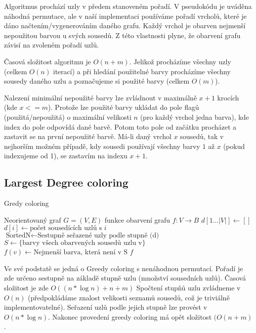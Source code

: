 \documentclass[12pt, a4paper]{article}
\begin{document}
Algoritmus prochází uzly v předem stanoveném pořadí.
V pseudokódu je uváděna náhodná permutace, ale v naší implementaci používáme pořadí vrcholů, které je dáno načtením/vygenerováním daného grafu.
Každý vrchol je obarven nejmenší nepoužitou barvou u svých sousedů.
Z této vlastnosti plyne, že obarvení grafu závisí na zvoleném pořadí uzlů.

Časová složitost algoritmu je $O(n+m)$.
Jelikož procházíme všechny uzly (celkem $O(n)$ iterací)
a při hledání použitelné barvy procházíme všechny sousedy daného uzlu a poznačujeme si použité barvy (celkem $O(m)$).

Nalezení minimální nepoužité barvy lze zvládnout v maximálně $x+1$ krocích (kde $x <= m$).
Protože lze použité barvy ukládat do pole flagů (použitá/nepoužitá) o maximální velikosti $n$ (pro každý vrchol jedna barva),
kde index do pole odpovídá dané barvě.
Potom toto pole od začátku procházet a zastavit se na první nepoužité barvě.
Má-li daný vrchol $x$ sousedů, tak v nejhorším možném případě, kdy sousedi používají všechny barvy $1$ až $x$ (pokud indexujeme od 1),
se zastavím na indexu $x+1$.

\subsection{Largest Degree coloring}
\begin{algorithm}
\caption{Gredy coloring} %
\label{Greedy coloring}
\begin{algorithmic}
\Input Neorientovaný graf $G = (V, E)$
\Output funkce obarvení grafu $f: 	V \rightarrow B$
\State $d[1 \dots |V|] \leftarrow []$
	\State $d[i] \leftarrow \text{počet sousedících uzlů s }i$
\EndFor
\State $\text{SortedN} \leftarrow \text{Sestupně seřazené uzly podle stupně (d)}$
	\State $S \leftarrow \{ \text{barvy všech obarvených sousedů uzlu v} \}$
	\State $f(v) \leftarrow \text{Nejmenší barva, která není v S}$ 
\EndFor
\State \Return $f$
\end{algorithmic}
\end{algorithm}

Ve své podstatě se jedná o Greedy coloring s nenáhodnou permutací.
Pořadí je zde určeno sestupně na základě stupně uzlu (množství sousedních uzlů).
Časová složitost je zde $O((n* \log n) + n + m)$
Spočtení stupňů uzlu zvládneme v $O(n)$ (předpokládáme znalost velikosti seznamů sousedů, což je triviálně implementovatelné).
Seřazení uzlů podle jejich stupně lze provést v $O(n * \log n)$.
Nakonec provedení greedy coloring má opět složitost $(O(n + m)$. 
\end{document}
